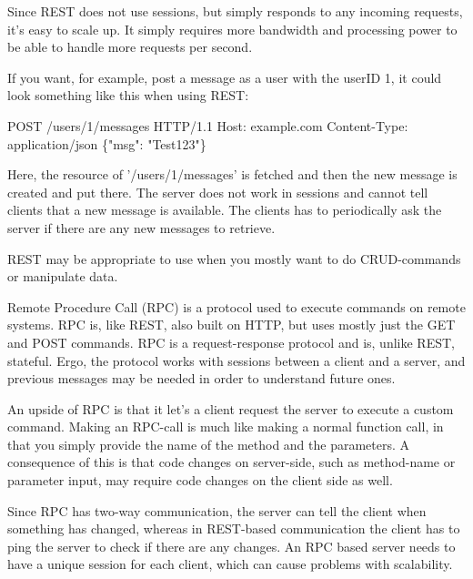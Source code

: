 \documentclass[11pt]{article}
\begin{document}
\begin{multicols}{2}
        Since REST does not use sessions, but simply responds to any incoming
        requests, it's easy to scale up. It simply requires more bandwidth and
        processing power to be able to handle more requests per second.

        If you want, for example, post a message as a user with the userID 1, it
        could look something like this when using REST:


        POST /users/1/messages HTTP/1.1
        Host: example.com
        Content-Type: application/json
        \{"msg": "Test123"\}


        Here, the resource of '/users/1/messages' is fetched and then the
        new message is created and put there. The server does not work in
        sessions and cannot tell clients that a new message is available. The
        clients has to periodically ask the server if there are any new messages
        to retrieve.

        REST may be appropriate to use when you mostly want to do CRUD-commands
        or manipulate data.


        Remote Procedure Call (RPC) is a protocol used to execute commands on remote systems. RPC is, like REST, also
        built on HTTP, but uses mostly just the GET and POST commands. RPC is a request-response protocol and is, unlike
        REST, stateful. Ergo, the protocol works with sessions between a client and a server, and previous messages may
        be needed in order to understand future ones.

        An upside of RPC is that it let's a client request the server to execute
        a custom command. Making an RPC-call is much like making a normal
        function call, in that you simply provide the name of the method and the
        parameters. A consequence of this is that code changes on server-side,
        such as method-name or parameter input, may require code changes on the
        client side as well.

        Since RPC has two-way communication, the server can tell the client when
        something has changed, whereas in REST-based communication the client
        has to ping the server to check if there are any changes. An RPC based
        server needs to have a unique session for each client, which can cause
        problems with scalability.


\end{multicols}
\end{document}
